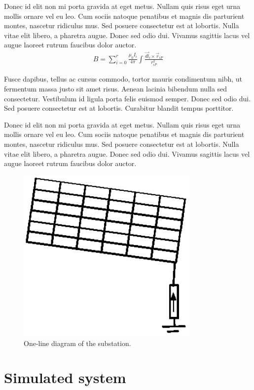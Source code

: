 \documentclass[journal]{../template/IEEEtran}
\begin{document}
Donec id elit non mi porta gravida at eget metus. Nullam quis risus eget urna mollis ornare vel eu leo. Cum sociis natoque penatibus et magnis dis parturient montes, nascetur ridiculus mus. Sed posuere consectetur est at lobortis. Nulla vitae elit libero, a pharetra augue. Donec sed odio dui. Vivamus sagittis lacus vel augue laoreet rutrum faucibus dolor auctor.
\begin{align}
	\label{eq:biot}
    B=\sum^{r}_{i=0} {\frac{\mu_{0}I_{i}}{4\pi}\int{\frac{\overrightarrow{dl}_{i}\times \overrightarrow{r}_{iP}}{r^{2}_{iP}}}}	
\end{align}

Fusce dapibus, tellus ac cursus commodo, tortor mauris condimentum nibh, ut fermentum massa justo sit amet risus. Aenean lacinia bibendum nulla sed consectetur. Vestibulum id ligula porta felis euismod semper. Donec sed odio dui. Sed posuere consectetur est at lobortis. Curabitur blandit tempus porttitor.

Donec id elit non mi porta gravida at eget metus. Nullam quis risus eget urna mollis ornare vel eu leo. Cum sociis natoque penatibus et magnis dis parturient montes, nascetur ridiculus mus. Sed posuere consectetur est at lobortis. Nulla vitae elit libero, a pharetra augue. Donec sed odio dui. Vivamus sagittis lacus vel augue laoreet rutrum faucibus dolor auctor.

\begin{figure}[b]
	\centering
		\includegraphics[width=3.5in]{../resources/image.eps}
		\caption{One-line diagram of the substation.}
	\label{fig:substationdiagram}
\end{figure}

\section{Simulated system}
\end{document}
